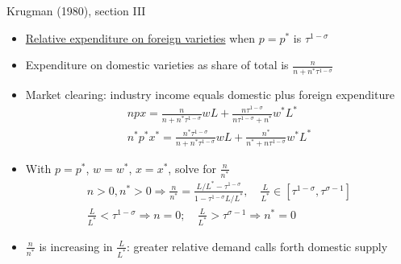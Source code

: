 \documentclass[11pt,notes=hide,aspectratio=169]{beamer}
\begin{document}
\begin{frame}{Krugman (1980), section III}
\begin{itemize}
	\item \href{http://www.columbia.edu/~jid2106/td/dixitstiglitzbasics.pdf}{Relative expenditure on foreign varieties} when $p=p^*$ is $\tau^{1-\sigma}$
	\item Expenditure on domestic varieties as share of total is $\frac{n}{n + n^*\tau^{1-\sigma}}$
	\item Market clearing: industry income equals domestic plus foreign expenditure
	\begin{align*}
	npx = \frac{n}{n + n^*\tau^{1-\sigma}} w L + \frac{n\tau^{1-\sigma}}{n\tau^{1-\sigma} + n^*} w^* L^* \\
	n^*p^*x^* = \frac{n^*\tau^{1-\sigma}}{n + n^*\tau^{1-\sigma}} w L + \frac{n^*}{n^* + n\tau^{1-\sigma}} w^* L^*
	\end{align*}
	\item With $p=p^*$, $w=w^*$, $x=x^*$, solve for $\frac{n}{n^*}$
	\begin{align*}
	n>0,n^*>0 \Rightarrow \frac{n}{n^*} = \frac{L/L^* - \tau^{1-\sigma}}{1 - \tau^{1-\sigma}L/L^*}, \quad \frac{L}{L^*} \in [\tau^{1-\sigma},\tau^{\sigma-1}] \\
	 \frac{L}{L^*} < \tau^{1-\sigma} \Rightarrow n = 0 ; \quad \frac{L}{L^*} > \tau^{\sigma-1} \Rightarrow n^* = 0 
	\end{align*}
	\item $\frac{n}{n^*}$ is increasing in $\frac{L}{L^*}$: greater relative demand calls forth domestic supply
\end{itemize}
\end{frame}
\end{document}
